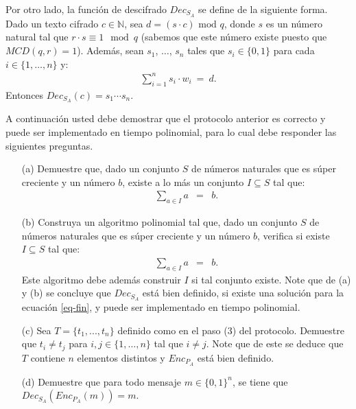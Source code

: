 Por otro lado, la función de descifrado $\textit{Dec}_{S_A}$ se define de la siguiente forma. Dado un texto cifrado $c \in \mathbb{N}$, sea $d = (s \cdot c) \text{ mod } q$, donde $s$ es un número natural tal que $r \cdot s \equiv 1 \mod q$ (sabemos que este número existe puesto que $\textit{MCD}(q,r) = 1$). Además, sean $s_1$, $\ldots$, $s_n$ tales que $s_i \in \{0,1\}$ para cada $i \in \{1, \ldots, n\}$ y:
\begin{align}
  \sum_{i=1}^n s_i \cdot w_i \ = \ d. \tag{\dag} \label{eq-fin}
\end{align}
Entonces $\textit{Dec}_{S_A}(c) = s_1 \cdots s_n$.

A continuación usted debe demostrar que el protocolo anterior es correcto y puede ser implementado en tiempo polinomial, para lo cual debe responder las siguientes preguntas.
\begin{itemize}
\item[(a)] Demuestre que, dado un conjunto $S$ de números naturales que es súper creciente y un número $b$, existe a lo más un conjunto $I \subseteq S$ tal que:
  \begin{eqnarray*}
    \sum_{a \in I} a &=& b.
  \end{eqnarray*}

\item[(b)] Construya un algoritmo polinomial tal que, dado un conjunto $S$ de números naturales que es súper creciente y un número $b$, verifica si existe $I \subseteq S$ tal que:
  \begin{eqnarray*}
    \sum_{a \in I} a &=& b.
  \end{eqnarray*}
  Este algoritmo debe además construir $I$ si tal conjunto existe. Note que de (a) y (b) se concluye que $\textit{Dec}_{S_A}$ está bien definido, si existe una solución para la ecuación \eqref{eq-fin}, y puede ser implementado en tiempo polinomial.

\item[(c)] Sea $T = \{t_1, ..., t_n\}$ definido como en el paso (3) del protocolo. Demuestre que $t_i \neq t_j$ para $i,j \in \{1, \ldots, n\}$ tal que $i \neq j$. Note que de este se deduce que $T$ contiene $n$ elementos distintos y $\textit{Enc}_{P_A}$ está bien definido.

\item[(d)] Demuestre que para todo mensaje $m \in \{0,1\}^n$, se tiene que $\textit{Dec}_{S_A}(\textit{Enc}_{P_A}(m)) = m$.
\end{itemize}

